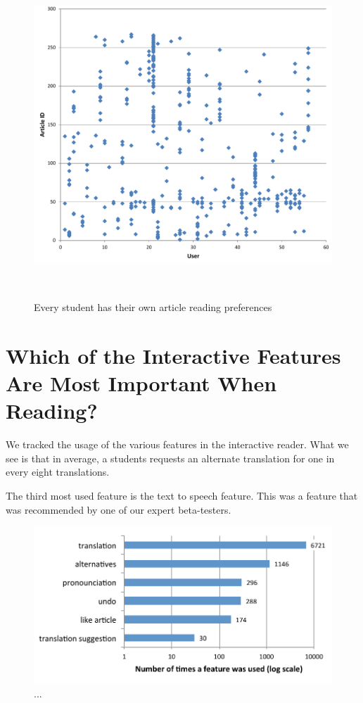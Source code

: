\begin{figure}[h!]
\centering
  \includegraphics[width=\columnwidth]{figures/users_articles}
  \caption{Every student has their own article reading preferences}~\label{fig:registrations}
\end{figure}

\newpage
\section{Which of the Interactive Features Are Most Important When Reading?}
We tracked the usage of the various features in the interactive reader. What we see is that in average, a students requests an alternate translation for one in every eight translations. 

The third most used feature is the text to speech feature. This was a feature that was recommended by one of our expert beta-testers. 


\begin{figure}[h!]
\centering
  \includegraphics[width=0.7\columnwidth]{figures/reader_feature_usage}
  \caption{... }
\end{figure}

